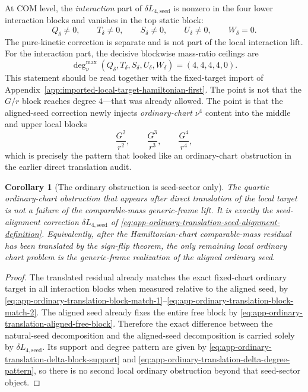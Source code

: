 \documentclass[11pt]{article}
\newtheorem{corollary}[theorem]{Corollary}
\begin{document}
At COM level, the \emph{interaction} part of $\delta L_{4,\mathrm{seed}}$ is
nonzero in the four lower interaction blocks and vanishes in the top static
block:
\begin{equation}
Q_\delta\neq 0,
\qquad
T_\delta\neq 0,
\qquad
S_\delta\neq 0,
\qquad
U_\delta\neq 0,
\qquad
W_\delta=0.
\label{eq:app-ordinary-translation-delta-block-support}
\end{equation}
The pure-kinetic correction is separate and is not part of the local interaction
lift.  For the interaction part, the decisive blockwise mass-ratio ceilings are
\begin{equation}
\deg_\nu^{\max}(Q_\delta,T_\delta,S_\delta,U_\delta,W_\delta)
=
(4,4,4,4,0).
\label{eq:app-ordinary-translation-delta-degree-pattern}
\end{equation}
This statement should be read together with the fixed-target import of
Appendix~\ref{app:imported-local-target-hamiltonian-first}.  The point is not
that the $G/r$ block reaches degree $4$---that was already allowed.  The point
is that the aligned-seed correction newly injects \emph{ordinary-chart}
$\nu^4$ content into the middle and upper local blocks
\begin{equation}
\frac{G^2}{r^2},
\qquad
\frac{G^3}{r^3},
\qquad
\frac{G^4}{r^4},
\label{eq:app-ordinary-translation-middle-upper-blocks}
\end{equation}
which is precisely the pattern that looked like an ordinary-chart obstruction in
the earlier direct translation audit.

\begin{corollary}[The ordinary obstruction is seed-sector only]
\label{cor:app-ordinary-translation-seed-sector-only}
The quartic ordinary-chart obstruction that appears after direct translation of
the local target is not a failure of the comparable-mass generic-frame lift.
It is exactly the seed-alignment correction
$\delta L_{4,\mathrm{seed}}$ of
\eqref{eq:app-ordinary-translation-seed-alignment-definition}.  Equivalently,
after the Hamiltonian-chart comparable-mass residual has been translated by the
sign-flip theorem, the only remaining local ordinary chart problem is the
generic-frame realization of the aligned ordinary seed.
\end{corollary}

\begin{proof}
The translated residual already matches the exact fixed-chart ordinary target in
all interaction blocks when measured relative to the aligned seed, by
\eqref{eq:app-ordinary-translation-block-match-1}--\eqref{eq:app-ordinary-translation-block-match-2}.
The aligned seed already fixes the entire free block by
\eqref{eq:app-ordinary-translation-aligned-free-block}.  Therefore the exact
difference between the natural-seed decomposition and the aligned-seed
decomposition is carried solely by
$\delta L_{4,\mathrm{seed}}$.  Its support and degree pattern are given by
\eqref{eq:app-ordinary-translation-delta-block-support} and
\eqref{eq:app-ordinary-translation-delta-degree-pattern}, so there is no second
local ordinary obstruction beyond that seed-sector object.
\end{proof}
\end{document}

